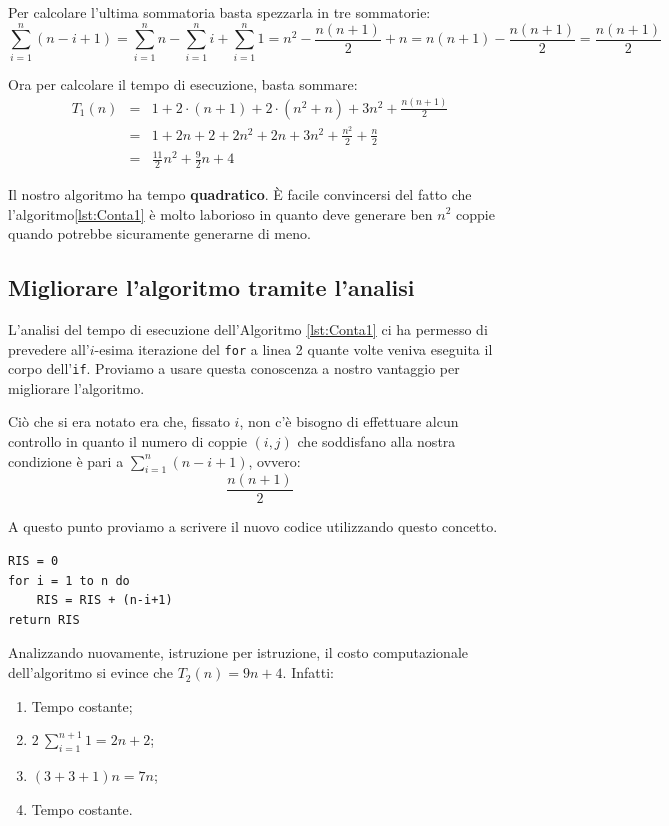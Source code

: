 Per calcolare l'ultima sommatoria basta spezzarla in tre sommatorie:
\begin{equation}
    \sum_{i=1}^{n} (n-i+1) = \sum_{i=1}^{n} n - \sum_{i=1}^{n} i + \sum_{i=1}^{n} 1 = n^2 - \frac{n(n+1)}{2} + n = n(n+1) - \frac{n(n+1)}{2} = \frac{n(n+1)}{2}
\end{equation}

Ora per calcolare il tempo di esecuzione, basta sommare:
\begin{eqnarray*}
    T_1(n) &=& 1+ 2\cdot(n+1) + 2\cdot(n^{2}+n)+3n^{2} + \frac{n(n+1)}{2} \\
    &=& 1 + 2n + 2 + 2n^2 + 2n + 3n^2 + \frac{n^2}{2} + \frac{n}{2} \\
    &=& \frac{11}{2}n^2 + \frac{9}{2}n + 4
\end{eqnarray*}

Il nostro algoritmo ha tempo \textbf{quadratico}. È facile convincersi del fatto che l'algoritmo\ref{lst:Conta1} è molto laborioso in quanto deve generare ben $n^{2}$ coppie quando potrebbe sicuramente generarne di meno.

\subsection{Migliorare l'algoritmo tramite l'analisi}
L'analisi del tempo di esecuzione dell'Algoritmo \ref{lst:Conta1} ci ha permesso di prevedere all'$i$-esima iterazione del \texttt{for} a linea 2 quante volte veniva eseguita il corpo dell'\texttt{if}. Proviamo a usare questa conoscenza a nostro vantaggio per migliorare l'algoritmo.

Ciò che si era notato era che, fissato $i$, non c'è bisogno di effettuare alcun controllo in quanto il numero di coppie $(i,j)$ che soddisfano alla nostra condizione è pari a $\displaystyle\sum_{i=1}^{n} (n-i+1)$, ovvero:
\begin{equation}
    \frac{n(n+1)}{2}
\end{equation}

A questo punto proviamo a scrivere il nuovo codice utilizzando questo concetto.

\begin{lstlisting}[label = lst:Conta2, language=asd, caption={Conta2(n)}]
RIS = 0
for i = 1 to n do
    RIS = RIS + (n-i+1)
return RIS
\end{lstlisting}

Analizzando nuovamente, istruzione per istruzione, il costo computazionale dell'algoritmo si evince che $T_2(n) = 9n+4$. Infatti:
\begin{enumerate}
  \item Tempo costante;
  \item $2\ \displaystyle\sum_{i = 1}^{n+1} 1 = 2n+2$;
  \item $(3+3+1) n = 7n$;
  \item Tempo costante.
\end{enumerate}

